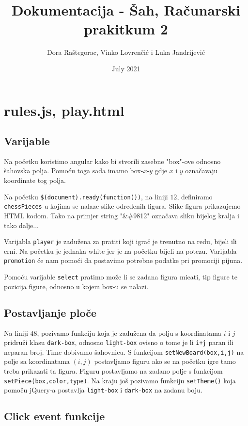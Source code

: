 \documentclass{article}
\title{Dokumentacija - Šah, Računarski prakitkum 2}
\author{Dora Raštegorac, Vinko Lovrenčić i Luka Jandrijević}
\date{July 2021}
\begin{document}
\maketitle

\section{rules.js, play.html}
\subsection{Varijable}
Na početku koristimo angular kako bi stvorili zasebne "box"-ove odnosno ša\-ho\-vska po\-lja. Pomoću toga sada imamo box-$x$-$y$ gdje $x$ i $y$ označavaju koordinate tog polja.

Na početku \verb|$(document).ready(function())|, na liniji $12$, de\-fi\-ni\-ra\-mo \\ 
\verb|chessPieces| u kojima se nalaze slike određenih figura. Slike figura prikazujemo HTML kodom. Tako na primjer string "\&\#9812" označava sliku bijelog kralja i tako dalje...

Varijabla \verb|player| je zadužena za pratiti koji igrač je trenutno na redu, bijeli ili crni. Na početku je jednaka white jer je na početku bijeli na potezu. Varijabla \verb|promotion| će nam pomoći da postavimo potrebne podatke pri promociji pijuna.

Pomoću varijable \verb|select| pratimo može li se zadana figura micati, tip figure te pozicija figure, odnosno u kojem box-u se nalazi.

\subsection{Postavljanje ploče}
Na liniji $48$, pozivamo funkciju koja je zadužena da polju s koordinatama $i$ i $j$ pridruži klasu \verb|dark-box|, odnosno \verb|light-box| ovisno o tome je li \verb|i+j| paran ili neparan broj. Time dobivamo šahovnicu. S funkcijom \verb|setNewBoard(box,i,j)| na polje sa koordinatama $(i,j)$ postavljamo figuru ako se na početku igre tamo treba prikazati ta figura. Figuru postavljamo na zadano polje s funkcijom  \\
\verb|setPiece(box,color,type)|. Na kraju još pozivamo funkciju \verb|setTheme()| koja pomoču jQuery-a postavlja \verb|light-box| i \verb|dark-box| na zadanu boju.

\subsection{Click event funkcije}
\end{document}
